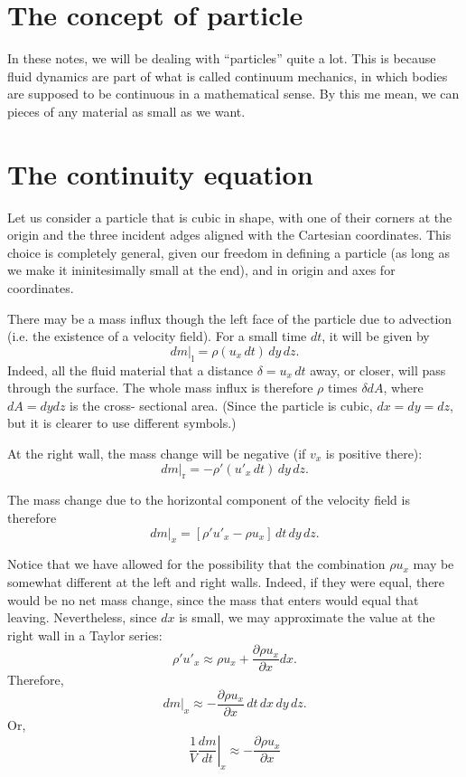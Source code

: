 \section{The concept of particle}

In these notes, we will be dealing with ``particles'' 
quite a lot. This is because fluid dynamics are part of what is called
continuum mechanics, in which bodies are supposed to be continuous in
a mathematical sense. By this me mean, we can pieces of any material
as small as we want. 


\section{The continuity equation}
\label{sec:continuity}

Let us consider a particle that is cubic in shape, with one of their
corners at the origin and the three incident adges aligned with the
Cartesian coordinates. This choice is completely general, given our
freedom in defining a particle (as long as we make it ininitesimally
small at the end), and in origin and axes for coordinates.

There may be a mass influx though the left face of the particle due
to advection (i.e. the existence of a velocity field). For a small
time $dt$, it will be given by
\[
\left. d m \right|_\text{l} =
\rho ( u_x \, dt) \, dy\, dz .
\]
Indeed, all the fluid material that a distance $\delta= u_x \, dt$
away, or closer, will pass through the surface. The whole mass influx
is therefore $\rho$ times $\delta dA$, where $dA=dy dz$ is the cross-
sectional area. (Since the particle is cubic, $dx=dy=dz$, but it is
clearer to use different symbols.)

At the right wall, the mass change will be negative (if $v_x$ is positive
there):
\[
\left. d m \right|_\text{r} =
 -  \rho' ( u'_x \, dt) \, dy\, dz .
\]

The mass change due to the horizontal component of the velocity field is
therefore
\[
\left. d m \right|_x =
  \left[  \rho'  u'_x -  \rho  u_x \right] \, dt \, dy\, dz .
\]

Notice that we have allowed for the possibility that the combination
$\rho u_x$ may be somewhat different at the left and right
walls. Indeed, if they were equal, there would be no net mass change,
since the mass that enters would equal that leaving. Nevertheless,
since $dx$ is small, we may approximate the value at the right
wall in a Taylor series:
\[
\rho'  u'_x \approx  \rho  u_x  +
\frac{\partial  \rho  u_x}{\partial x} dx .
\]
Therefore,
\[
\left. d m \right|_x \approx
-\frac{\partial  \rho  u_x}{\partial x} \, dt \, dx \, dy\, dz .
\]
Or,
\[
\frac1V \left. \frac{d m}{d t} \right|_x \approx
-\frac{\partial  \rho  u_x}{\partial x}
\]

